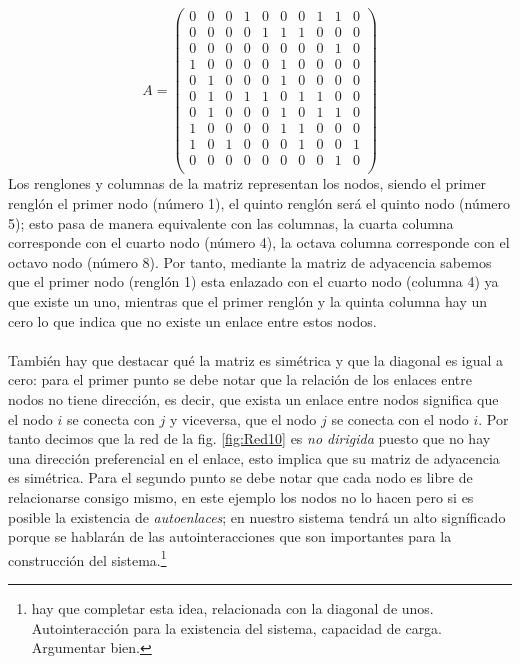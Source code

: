 $$
A = \begin{pmatrix}
	0 & 0 & 0 & 1 & 0 & 0 & 0 & 1 & 1 & 0\\
	0 & 0 & 0 & 0 & 1 & 1 & 1 & 0 & 0 & 0\\
	0 & 0 & 0 & 0 & 0 & 0 & 0 & 0 & 1 & 0\\
	1 & 0 & 0 & 0 & 0 & 1 & 0 & 0 & 0 & 0\\
	0 & 1 & 0 & 0 & 0 & 1 & 0 & 0 & 0 & 0\\
	0 & 1 & 0 & 1 & 1 & 0 & 1 & 1 & 0 & 0\\
	0 & 1 & 0 & 0 & 0 & 1 & 0 & 1 & 1 & 0\\
	1 & 0 & 0 & 0 & 0 & 1 & 1 & 0 & 0 & 0\\
	1 & 0 & 1 & 0 & 0 & 0 & 1 & 0 & 0 & 1\\
	0 & 0 & 0 & 0 & 0 & 0 & 0 & 0 & 1 & 0\\
\end{pmatrix}
$$
Los renglones y columnas de la matriz representan los nodos, siendo el primer renglón el primer nodo (número 1), el quinto renglón será el quinto nodo (número 5); esto pasa de manera equivalente con las columnas, la cuarta columna corresponde con el cuarto nodo (número 4), la octava columna corresponde con el octavo nodo (número 8). Por tanto, mediante la matriz de adyacencia sabemos que el primer nodo (renglón 1) esta enlazado con el cuarto nodo (columna 4) ya que existe un uno, mientras que el primer renglón y la quinta columna hay un cero lo que indica que no existe un enlace entre estos nodos. \\
\\
También hay que destacar qué la matriz es simétrica y que la diagonal es igual a cero: para el primer punto se debe notar que la relación de los enlaces entre nodos no tiene dirección, es decir, que exista un enlace entre nodos significa que el nodo $i$ se conecta con $j$ y viceversa, que el nodo $j$ se conecta con el nodo $i$. Por tanto decimos que la red de la fig. \ref{fig:Red10} es \textit{no dirigida} puesto que no hay una dirección preferencial en el enlace, esto implica que su matriz de adyacencia es simétrica. Para el segundo punto se debe notar que cada nodo es libre de relacionarse consigo mismo, en este ejemplo los nodos no lo  hacen pero si es posible la existencia de \textit{autoenlaces}; en nuestro sistema tendrá un alto signíficado porque se hablarán de las autointeracciones que son importantes para la construcción del sistema.\footnote{hay que completar esta idea, relacionada con la diagonal de unos. Autointeracción para la existencia del sistema, capacidad de carga. Argumentar bien.}
